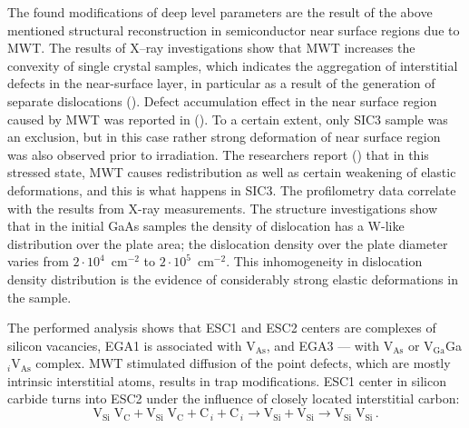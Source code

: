 \documentclass[final,3p,times,twocolumn,authoryear]{elsarticle}
\begin{document}
The found modifications of deep level parameters are the result of the above mentioned
structural reconstruction in semiconductor near surface regions  due to MWT.
The results of X--ray investigations show that MWT increases the convexity of single crystal samples,
which indicates the aggregation of interstitial defects in the near-surface layer,
in particular as a result of the generation of separate dislocations (\cite{BoltovetsEn,Konakova2012FTPEn}).
Defect accumulation effect in the near surface region caused by MWT was reported in (\cite{BoltovetsEn,Konakova2015En}).
To a certain extent, only SIC3 sample was an exclusion, but in this case rather strong deformation of near surface region was also observed prior to irradiation.
The researchers report (\cite{Bacherikov2003En,Pashkov1994En,BoltovetsEn,Milenin1994En,BelyaevIntac}) that in this stressed state,
MWT causes redistribution as well as certain weakening of elastic deformations, and this is what happens in SIC3.
The profilometry data correlate with the results from X-ray measurements.
The structure investigations show that 
in the initial GaAs samples the density of dislocation has a W-like distribution over the plate area; the dislocation density over the plate diameter varies from $2\cdot10^{4}$~cm$^{-2}$ to $2\cdot10^{5}$~cm$^{-2}$.
This inhomogeneity in dislocation density distribution is the evidence of considerably strong elastic deformations in the sample.



%
%
%
%
%
%

The performed analysis shows that ESC1 and ESC2 centers are complexes of silicon vacancies,
EGA1 is associated with V$_\mathrm{As}$,
and EGA3 — with V$_\mathrm{As}$ or  V$_\mathrm{Ga}$Ga$_i$V$_\mathrm{As}$ complex.
MWT stimulated diffusion of the point defects, which are mostly intrinsic interstitial atoms, results in trap modifications.
ESC1 center in silicon carbide turns into ESC2 under the influence of closely located interstitial carbon:
\begin{displaymath}
  \mathrm{V}_\mathrm{Si}\;\mathrm{V}_\mathrm{C}+\mathrm{V}_\mathrm{Si}\;\mathrm{V}_\mathrm{C}+\mathrm{C}_{\,i}+ \mathrm{C}_{\,i} \rightarrow \mathrm{V}_\mathrm{Si}+ \mathrm{V}_\mathrm{Si}\rightarrow \mathrm{V}_\mathrm{Si}\;\mathrm{V}_\mathrm{Si}\,.
\end{displaymath}
\end{document}
